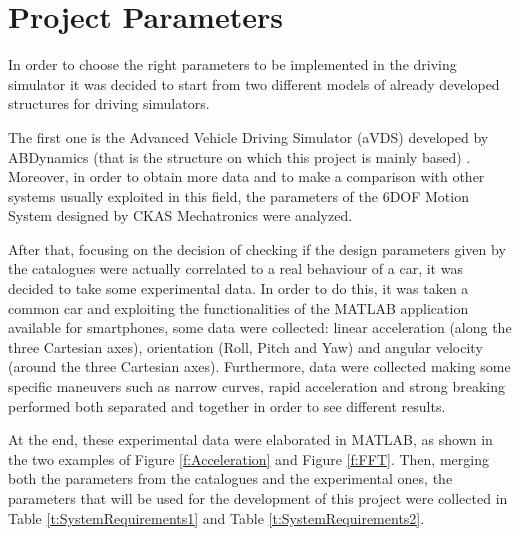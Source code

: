 \documentclass[10.5pt, twocolumn]{article}
\begin{document}
\section{Project Parameters}
In order to choose the right parameters to be implemented in the driving simulator it was decided to start from two different models of already developed structures for driving simulators.

The first one is the Advanced Vehicle Driving Simulator (aVDS) developed by ABDynamics (that is the structure on which this project is mainly based) \cite{aVDS}.
Moreover, in order to obtain more data and to make a comparison with other systems usually exploited in this field, the parameters of the 6DOF Motion System designed by CKAS Mechatronics \cite{CKAS} were analyzed.

After that, focusing on the decision of checking if the design parameters given by the catalogues were actually correlated to a real behaviour of a car, it was decided to take some experimental data.
In order to do this, it was taken a common car and exploiting the functionalities of the MATLAB application available for smartphones, some data were collected: linear acceleration (along the three Cartesian axes), orientation (Roll, Pitch and Yaw) and angular velocity (around the three Cartesian axes).
Furthermore, data were collected making some specific maneuvers such as narrow curves, rapid acceleration and strong breaking performed both separated and together in order to see different results.

At the end, these experimental data were elaborated in MATLAB, as shown in the two examples of Figure \ref{f:Acceleration} and Figure \ref{f:FFT}.
Then, merging both the parameters from the catalogues and the experimental ones, the parameters that will be used for the development of this project were collected in Table \ref{t:SystemRequirements1} and Table \ref{t:SystemRequirements2}.
\end{document}
